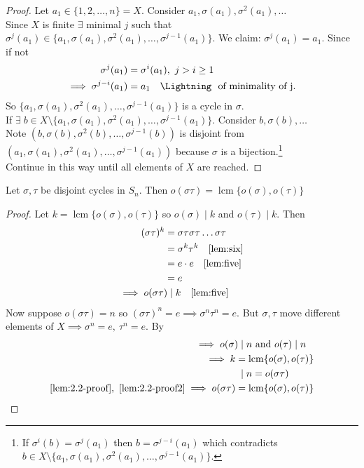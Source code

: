 \begin{proof}
Let $a_1 \in \{ 1, 2, \dots, n \} = X$.
Consider $a_1, \sigma(a_1), \sigma^2(a_1), \dots$\\
Since $X$ is finite $\exists$ minimal $j$ such that $\sigma^j(a_1) \in \{ a_1, \sigma(a_1), \sigma^2(a_1), \dots, \sigma^{j-1}(a_1) \}$.
We claim: $\sigma^j(a_1) = a_1$.
Since if not \begin{align*}
    \sigma^j(a_1) &= \sigma^i(a_1),\ j > i \geq 1 \\
    \implies \sigma^{j - i}(a_1) &= a_1 \quad \text{\Lightning \ of minimality of j.}
\end{align*}
So $\{ a_1, \sigma(a_1), \sigma^2(a_1), \dots, \sigma^{j-1}(a_1) \}$ is a cycle in $\sigma$.\\
If $\exists \; b \in X \setminus \{ a_1, \sigma(a_1), \sigma^2(a_1), \dots, \sigma^{j-1}(a_1) \}$.
Consider $b, \sigma(b), \dots$\\
Note $\left(b, \sigma(b), \sigma^2(b), \dots, \sigma^{j-1}(b) \right)$ is disjoint from $\left( a_1, \sigma(a_1), \sigma^2(a_1), \dots, \sigma^{j-1}(a_1) \right)$ because $\sigma$ is a bijection.\footnote{If $\sigma^i(b) = \sigma^j(a_1)$ then $b = \sigma^{j - i}(a_1)$ which contradicts $b \in X \setminus \{ a_1, \sigma(a_1), \sigma^2(a_1), \dots, \sigma^{j-1}(a_1) \}$.}\\
Continue in this way until all elements of $X$ are reached.
\end{proof}

\begin{lemma}
Let $\sigma, \tau$ be disjoint cycles in $S_n$.
Then $o(\sigma \tau) = \operatorname{lcm} \{ o(\sigma), o(\tau) \}$
\end{lemma}

\begin{proof}
Let $k = \operatorname{lcm} \{ o(\sigma), o(\tau) \}$ so $o(\sigma) \mid k$ and $o(\tau) \mid k$.
Then \begin{align}
    (\sigma \tau)^k &= \sigma \tau \sigma \tau \dots \sigma \tau \notag\\
    &= \sigma^k \tau^k \quad \text{\Cref{lem:six}} \notag \\
    &= e \cdot e \quad \text{\Cref{lem:five}} \notag\\
    &= e \notag \\
    \implies o(\sigma \tau) \mkern-5mu &\;\mid k \quad \text{\Cref{lem:five}} \label{lem:2.2-proof}
\end{align}
Now suppose $o(\sigma \tau) = n$ so $(\sigma \tau)^n = e \implies \sigma^n \tau^n = e$.
But $\sigma, \tau$ move different elements of $X \implies \sigma^n = e,\ \tau^n = e$.
By 
\begin{align}
    \implies o(\sigma) \mkern-5mu &\;\mid n \text{ and } o(\tau) \mid n \notag\\
    \implies k &= \operatorname{lcm} \{ o(\sigma), o(\tau) \} \notag\\
    &\;\mid n = o(\sigma \tau) \label{lem:2.2-proof2} \\
    \cref{lem:2.2-proof},\ \cref{lem:2.2-proof2} \implies o(\sigma \tau) &= \operatorname{lcm} \{ o(\sigma), o(\tau) \} \notag
\end{align}
\end{proof}

